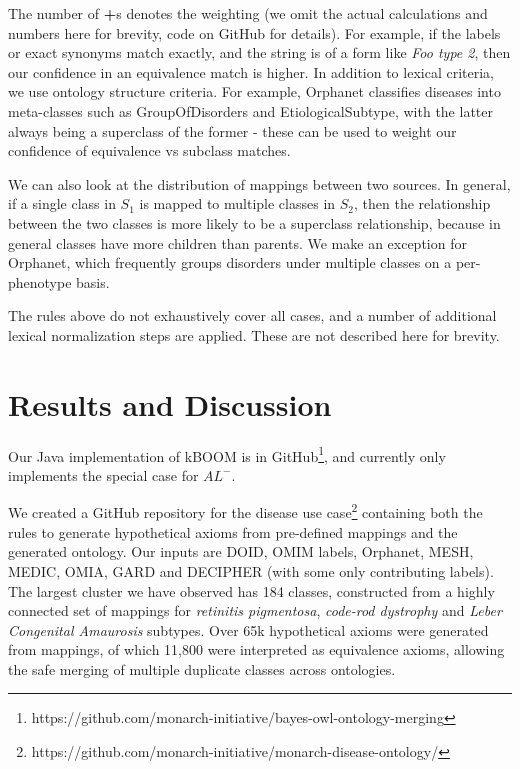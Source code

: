 \documentclass{my}
\begin{document}
The number of \textbf{+}s denotes the weighting (we omit the actual
calculations and numbers here for brevity, code on GitHub for
details). For example, if the labels or exact synonyms match exactly,
and the string is of a form like \emph{Foo type 2}, then our confidence
in an equivalence match is higher. In addition to lexical criteria, we
use ontology structure criteria. For example, Orphanet classifies
diseases into meta-classes such as GroupOfDisorders and
EtiologicalSubtype, with the latter always being a superclass of the
former - these can be used to weight our confidence of equivalence vs
subclass matches.

We can also look at the distribution of mappings between two
sources. In general, if a single class in $S_1$ is mapped to multiple
classes in $S_2$, then the relationship between the two classes is
more likely to be a superclass relationship, because in general
classes have more children than parents. We make an exception for
Orphanet, which frequently groups disorders under multiple classes on
a per-phenotype basis.

The rules above do not exhaustively cover all cases, and a number of
additional lexical normalization steps are applied. These are not
described here for brevity.

\section{Results and Discussion}

Our Java implementation of kBOOM is in
GitHub\footnote{https://github.com/monarch-initiative/bayes-owl-ontology-merging},
and currently only implements the special case for $AL^{-}$.

We created a GitHub repository for the disease use
case\footnote{https://github.com/monarch-initiative/monarch-disease-ontology/}
containing both the rules to generate hypothetical axioms from
pre-defined mappings and the generated ontology. Our inputs are DOID,
OMIM labels, Orphanet, MESH, MEDIC, OMIA, GARD and DECIPHER (with some only contributing labels). The largest cluster we
have observed has 184 classes, constructed from a highly connected set
of mappings for \emph{retinitis pigmentosa}, \emph{code-rod dystrophy} and \emph{Leber
Congenital Amaurosis} subtypes. Over 65k hypothetical axioms were
generated from mappings, of which 11,800 were interpreted as
equivalence axioms, allowing the safe merging of multiple duplicate
classes across ontologies.
\end{document}
